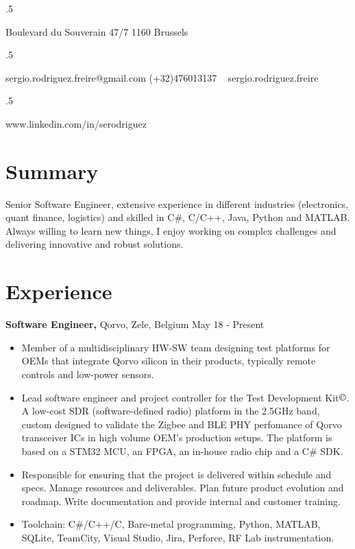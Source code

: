 \documentclass[margin]{res}
\begin{document}

\begin{resume}

\moveleft.5\hoffset\centerline{Boulevard du Souverain 47/7 1160 Brussels}
\moveleft.5\hoffset\centerline{sergio.rodriguez.freire@gmail.com \hspace{2 mm} \Mobilefone \hspace{1 mm} (+32)476013137 \hspace{2 mm} \faSkype\ \hspace{1 mm} sergio.rodriguez.freire}
\moveleft.5\hoffset\centerline{\faLinkedin \hspace{1 mm} www.linkedin.com/in/serodriguez}


\section{Summary}
Senior Software Engineer, extensive experience in different industries (electronics, quant finance, logistics) and skilled in C\#, C/C++, Java, Python and MATLAB. Always willing to learn new things, I enjoy working on complex challenges and delivering innovative and robust solutions. 

\section{Experience}

 {\bf Software Engineer,} Qorvo, Zele, Belgium \hfill May 18 - Present
 \begin{itemize} \itemsep -2pt
 \item Member of a multidisciplinary HW-SW team designing test platforms for OEMs that integrate Qorvo silicon in their products, typically remote controls and low-power sensors.
 \item Lead software engineer and project controller for the Test Development Kit$\copyright$. A low-cost SDR (software-defined radio) platform in the 2.5GHz band, custom designed to validate the Zigbee and BLE PHY perfomance of Qorvo transceiver ICs in high volume OEM's production setups. The platform is based on a STM32 MCU, an FPGA, an in-house radio chip and a C\# SDK.
 \item Responsible for ensuring that the project is delivered within schedule and specs. Manage resources and deliverables. Plan future product evolution and roadmap. Write documentation and provide internal and customer training.
 \item Toolchain: C\#/C++/C, Bare-metal programming, Python, MATLAB, SQLite, TeamCity, Visual Studio, Jira, Perforce, RF Lab instrumentation.
\end{itemize}


\end{resume}
\end{document}
